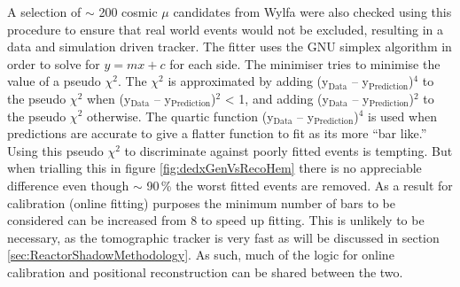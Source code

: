 A selection of $\sim$ 200 cosmic $\mu$ candidates from Wylfa were also checked using this procedure to ensure that real world events would not be excluded, resulting in a data and simulation driven tracker. The fitter uses the GNU simplex algorithm \cite{galassi2002gnu} in order to solve for $y = mx + c$ for each side. The minimiser tries to minimise the value of a pseudo $\chi^2$. The $\chi^2$ is approximated by adding (y$_\textrm{{Data}}$ -- y$_\textrm{{Prediction}}$)$^4$ to the pseudo $\chi^2$ when (y$_\textrm{{Data}}$ -- y$_\textrm{{Prediction}}$)$^2$ < 1, and adding (y$_\textrm{{Data}}$ -- y$_\textrm{{Prediction}}$)$^2$ to the pseudo $\chi^2$ otherwise. The quartic function (y$_\textrm{{Data}}$ -- y$_\textrm{{Prediction}}$)$^4$ is used when predictions are accurate to give a flatter function to fit as its more ``bar like.'' Using this pseudo $\chi^2$ to discriminate against poorly fitted events is tempting. But when trialling this in figure \ref{fig:dedxGenVsRecoHem} there is no appreciable difference even though $\sim$ 90\,\% the worst fitted events are removed. As a result for calibration (online fitting) purposes the minimum number of bars to be considered can be increased from 8 to speed up fitting. This is unlikely to be necessary, as the tomographic tracker is very fast as will be discussed in section \ref{sec:ReactorShadowMethodology}. As such, much of the logic for online calibration and positional reconstruction can be shared between the two. 

